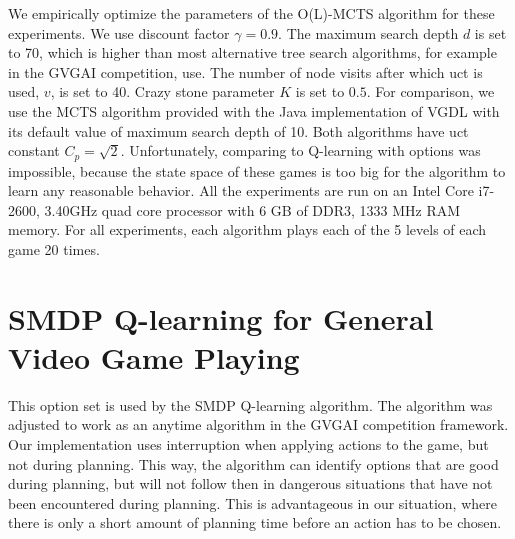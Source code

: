 We empirically optimize the parameters of the O(L)-MCTS algorithm for these
experiments. We use discount factor $\gamma = 0.9$. The maximum search depth $d$
is set to 70, which is higher than most alternative tree search algorithms, for
example in the GVGAI competition, use. The number of node visits after which
\textsf{uct} is used, $v$, is set to 40. Crazy stone parameter $K$ is set to
$0.5$.  For comparison, we use the MCTS algorithm provided with the Java
implementation of VGDL with its default value of maximum search depth of 10.
Both algorithms have \textsf{uct} constant $C_p = \sqrt{2}$. Unfortunately,
comparing to Q-learning with options was impossible, because the state space of
these games is too big for the algorithm to learn any reasonable behavior. All
the experiments are run on an Intel %
Core %
i7-2600, 3.40GHz quad core processor with 6 GB of DDR3, 1333 MHz RAM memory. For
all experiments, each algorithm plays each of the 5 levels of each game 20
times. 

\section{SMDP Q-learning for General Video Game Playing}
\label{subsec:smdp-qlearning-gvgp}

This option set is used by the SMDP Q-learning algorithm. The algorithm was
adjusted to work as an anytime algorithm in the GVGAI competition framework.
Our implementation uses interruption when applying actions to the game, but not
during planning. This way, the algorithm can identify options that are good
during planning, but will not follow then in dangerous situations that have not
been encountered during planning. This is advantageous in our situation, where
there is only a short amount of planning time before an action has to be chosen.


